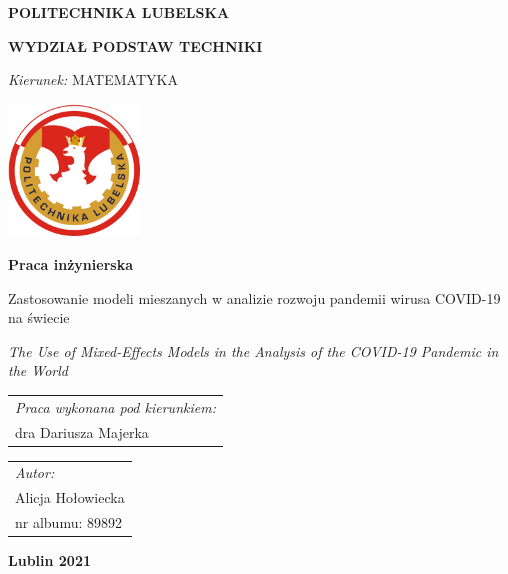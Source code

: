 \documentclass[12pt]{mwbk}
\theoremstyle{plain}
\theoremstyle{definition}
\theoremstyle{definition}
\begin{document}

\thispagestyle{empty}  %


\newcommand\tytul{Zastosowanie modeli mieszanych w analizie rozwoju pandemii wirusa COVID-19 na świecie}

\newcommand\tytulangielski{The Use of Mixed-Effects Models in the Analysis of the COVID-19 Pandemic in the World}


\begin{center}


{\large \bf POLITECHNIKA LUBELSKA}

{\bf WYDZIAŁ PODSTAW TECHNIKI}

\emph{Kierunek:} MATEMATYKA


\vfill %
     

\includegraphics[width=3.5cm]{rys/logopl}

\vfill

\textbf{Praca inżynierska}

\vfill
\vfill
\vfill

\large
\tytul

\vfill

\emph{\tytulangielski}


\vfill
\vfill
\vfill
\vfill
\vfill

\begin{tabular}[t]{l}
\emph{Praca wykonana pod kierunkiem:}
\\
dra Dariusza Majerka
\end{tabular}
\hfill
\begin{tabular}[t]{l}
	\emph{Autor:}
\\
Alicja Hołowiecka\\
nr albumu: 89892 
\end{tabular}

\vfill
\vfill
\vfill

\textbf{Lublin 2021}

\end{center}
\end{document}
